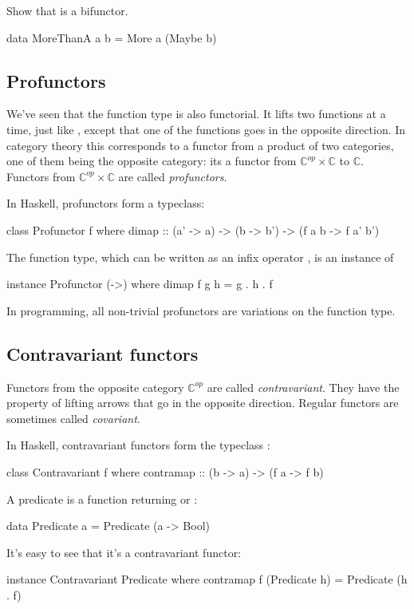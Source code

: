 \documentclass[DaoFP]{subfiles}
\begin{document}
\begin{exercise}
Show that  is a bifunctor.
\begin{haskell}
data MoreThanA a b = More a (Maybe b)
\end{haskell}
\end{exercise}


\subsection{Profunctors}

We've seen that the function type is also functorial. It lifts two functions at a time, just like , except that one of the functions goes in the opposite direction. In category theory this corresponds to a functor from a product of two categories, one of them being the opposite category: its a functor from $\mathbb{C}^{op} \times \mathbb{C}$ to $\mathbb{C}$. Functors from $\mathbb{C}^{op} \times \mathbb{C}$ are called \emph{profunctors}.

In Haskell, profunctors form a typeclass:
\begin{haskell}
class Profunctor f where
  dimap :: (a' -> a) -> (b -> b') -> (f a b -> f a' b')
\end{haskell}

The function type, which can be written as an infix operator \hask{(->)}, is an instance of 
\begin{haskell}
instance Profunctor (->) where
  dimap f g h = g . h . f
\end{haskell}

In programming, all non-trivial profunctors are variations on the function type. 

\subsection{Contravariant functors}

Functors from the opposite category $\mathbb{C}^{op}$ are called \emph{contravariant}. They have the property of lifting arrows that go in the opposite direction. Regular functors are sometimes called \emph{covariant}.

In Haskell, contravariant functors form the typeclass :
\begin{haskell}
class Contravariant f where
  contramap :: (b -> a) -> (f a -> f b)
\end{haskell}

A predicate is a function returning  or :
\begin{haskell}
data Predicate a = Predicate (a -> Bool)
\end{haskell}
It's easy to see that it's a contravariant functor:
\begin{haskell}
instance Contravariant Predicate where
  contramap f (Predicate h) = Predicate (h . f)
\end{haskell}
\end{document}
